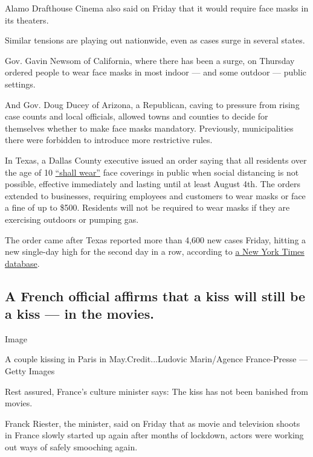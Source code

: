 Alamo Drafthouse Cinema also said on Friday that it would require face
masks in its theaters.

Similar tensions are playing out nationwide, even as cases surge in
several states.

Gov. Gavin Newsom of California, where there has been a surge, on
Thursday ordered people to wear face masks in most indoor --- and some
outdoor --- public settings.

And Gov. Doug Ducey of Arizona, a Republican, caving to pressure from
rising case counts and local officials, allowed towns and counties to
decide for themselves whether to make face masks mandatory. Previously,
municipalities there were forbidden to introduce more restrictive rules.

In Texas, a Dallas County executive issued an order saying that all
residents over the age of 10
\href{https://www.dallascounty.org/Assets/uploads/docs/covid-19/orders-media/061920-Amended-SupplementalOrderonContinuingRequirements.pdf}{``shall
wear''} face coverings in public when social distancing is not possible,
effective immediately and lasting until at least August 4th. The orders
extended to businesses, requiring employees and customers to wear masks
or face a fine of up to \$500. Residents will not be required to wear
masks if they are exercising outdoors or pumping gas.

The order came after Texas reported more than 4,600 new cases Friday,
hitting a new single-day high for the second day in a row, according to
\href{https://www.nytimes.com/interactive/2020/us/texas-coronavirus-cases.html}{a
New York Times database}.

\hypertarget{a-french-official-affirms-that-a-kiss-will-still-be-a-kiss--in-the-movies}{%
\subsection{A French official affirms that a kiss will still be a kiss
--- in the
movies.}\label{a-french-official-affirms-that-a-kiss-will-still-be-a-kiss--in-the-movies}}

Image

A couple kissing in Paris in May.Credit...Ludovic Marin/Agence
France-Presse --- Getty Images

Rest assured, France's culture minister says: The kiss has not been
banished from movies.

Franck Riester, the minister, said on Friday that as movie and
television shoots in France slowly started up again after months of
lockdown, actors were working out ways of safely smooching again.

